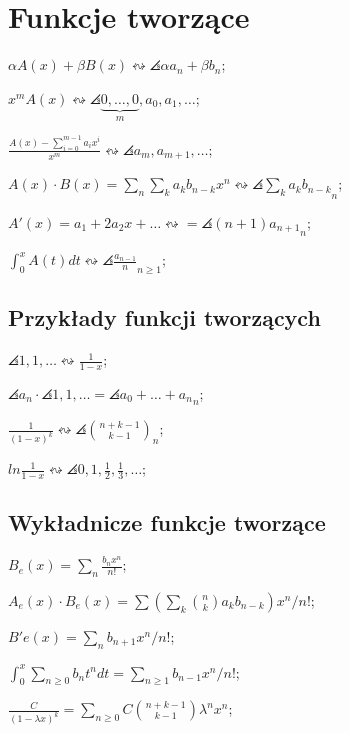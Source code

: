 \section{Funkcje tworzące}

$\alpha A(x) + \beta B(x) \leftrightsquigarrow \angles{\alpha a_n + \beta b_n}$;

$x^mA(x) \leftrightsquigarrow
  \angles{\underbrace{0, \dots, 0}_m, a_0, a_1, \dots}$;

$\frac{A(x) - \sum_{i=0}^{m-1}a_ix^i}{x^m} \leftrightsquigarrow
  \angles{a_m, a_{m+1}, \dots}$;

$A(x) \cdot B(x) =
  \sum_n \sum_k a_kb_{n-k}x^n \leftrightsquigarrow
  \angles{\sum_k a_k b_{n-k}}_n$;

$A'(x) = a_1 + 2a_2x + \dots \leftrightsquigarrow = \angles{(n+1)a_{n+1}}_n$;

$\int_0^xA(t)dt \leftrightsquigarrow \angles{\frac{a_{n-1}}{n}}_{n \geq 1}$;

\subsection{Przykłady funkcji tworzących}

$\angles{1,1,\dots} \leftrightsquigarrow \frac{1}{1-x}$;

$\angles{a_n} \cdot \angles{1,1,\dots} = \angles{a_0 + \dots + a_n}_n$;

$\frac{1}{(1-x)^k} \leftrightsquigarrow \angles{\binom{n + k -1}{k - 1}}_n$;

$ln \frac{1}{1-x} \leftrightsquigarrow
  \angles{0, 1, \frac{1}{2}, \frac{1}{3}, \dots}$;

\subsection{Wykładnicze funkcje tworzące}

$B_e(x) = \sum_n \frac{b_nx^n}{n!}$;

$A_e(x) \cdot B_e(x) =
  \sum \left ( \sum_k \binom{n}{k} a_k b_{n-k} \right ) x^n / n!$;

$B'e(x) = \sum_n b_{n+1} x^n/n!$;

$\int^x_0 \sum_{n \geq 0} b_nt^ndt = \sum_{n \geq 1} b_{n-1}x^n/n!$;

$\frac{C}{(1-\lambda x)^k} =
  \sum_{n\geq 0} C \binom{n + k - 1}{k - 1} \lambda^n x^n$;



